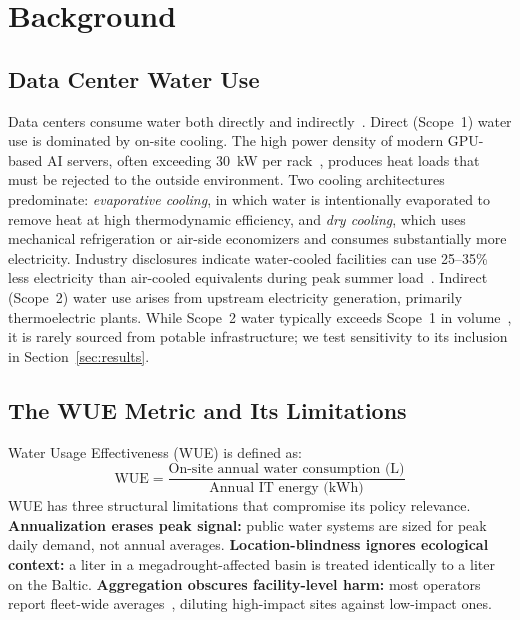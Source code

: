 \documentclass[conference,10pt]{IEEEtran}
\begin{document}
\section{Background}
\label{sec:background}

\subsection{Data Center Water Use}

Data centers consume water both directly and
indirectly~\cite{li2023thirsty, han2026}. Direct (Scope~1) water use is
dominated by on-site cooling. The high power density of modern GPU-based
AI servers, often exceeding 30~kW per rack~\cite{lbnl2024}, produces
heat loads that must be rejected to the outside environment. Two cooling
architectures predominate: \emph{evaporative cooling}, in which water is
intentionally evaporated to remove heat at high thermodynamic
efficiency, and \emph{dry cooling}, which uses mechanical refrigeration
or air-side economizers and consumes substantially more electricity.
Industry disclosures indicate water-cooled facilities can use 25--35\%
less electricity than air-cooled equivalents during peak summer
load~\cite{han2026, google2025envreport}. Indirect (Scope~2) water use
arises from upstream electricity generation, primarily thermoelectric
plants. While Scope~2 water typically exceeds Scope~1 in
volume~\cite{li2023thirsty}, it is rarely sourced from potable
infrastructure; we test sensitivity to its inclusion in
Section~\ref{sec:results}.

\subsection{The WUE Metric and Its Limitations}

Water Usage Effectiveness (WUE) is defined as:
\begin{equation}
\textrm{WUE} = \frac{\textrm{On-site annual water consumption (L)}}
                    {\textrm{Annual IT energy (kWh)}}
\label{eq:wue}
\end{equation}
WUE has three structural limitations that compromise its policy relevance.
\textbf{Annualization erases peak signal:} public water systems are sized
for peak daily demand, not annual averages. \textbf{Location-blindness
ignores ecological context:} a liter in a megadrought-affected basin is
treated identically to a liter on the Baltic. \textbf{Aggregation obscures
facility-level harm:} most operators report fleet-wide
averages~\cite{microsoft2024sustain, meta2025sustain, amazon2024aws},
diluting high-impact sites against low-impact ones.
\end{document}
